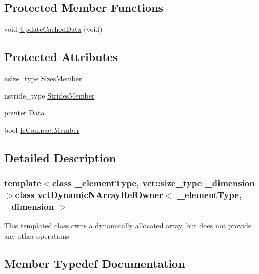 \subsection*{Protected Member Functions}
\begin{DoxyCompactItemize}
\item 
void \hyperlink{classvct_dynamic_n_array_ref_owner_aaa8c0a9dacde15a25bb15e82bf1d3639}{Update\+Cached\+Data} (void)
\end{DoxyCompactItemize}
\subsection*{Protected Attributes}
\begin{DoxyCompactItemize}
\item 
nsize\+\_\+type \hyperlink{classvct_dynamic_n_array_ref_owner_af231e48b1bbeb0320c3e6cffffa1dc20}{Sizes\+Member}
\item 
nstride\+\_\+type \hyperlink{classvct_dynamic_n_array_ref_owner_a51d8276e7feb516e682465d378ae2521}{Strides\+Member}
\item 
pointer \hyperlink{classvct_dynamic_n_array_ref_owner_a11dcdd9e556492e0c6ef418b18723a04}{Data}
\item 
bool \hyperlink{classvct_dynamic_n_array_ref_owner_ab650c2c3e47f0cf87e973e35a04d9175}{Is\+Compact\+Member}
\end{DoxyCompactItemize}


\subsection{Detailed Description}
\subsubsection*{template$<$class \+\_\+element\+Type, vct\+::size\+\_\+type \+\_\+dimension$>$class vct\+Dynamic\+N\+Array\+Ref\+Owner$<$ \+\_\+element\+Type, \+\_\+dimension $>$}

This templated class owns a dynamically allocated array, but does not provide any other operations 

\subsection{Member Typedef Documentation}
\hypertarget{classvct_dynamic_n_array_ref_owner_ab6652472746656a9be2de178295fd80b}{}
